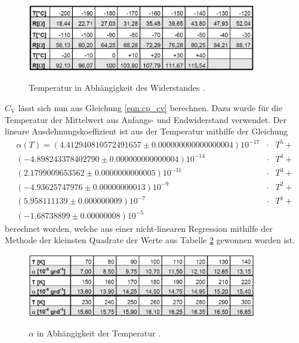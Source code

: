 \begin{figure}[!h]
	\centering
	\caption[]{Temperatur in Abhängigkeit des Widerstandes \cite{V47}.}
	\includegraphics[width = 10cm]{img/temperatur.png}	
	\label{Temperatur}
\end{figure}

$C_\mathrm{V}$ lässt sich nun aus Gleichung \eqref{eqn:cp_cv} 
berechnen.
Dazu wurde für die Temperatur der Mittelwert aus Anfangs- und Endwiderstand verwendet.
Der lineare Ausdehnungskoeffizient ist aus der Temperatur mithilfe der Gleichung
\begin{eqnarray*}
	\alpha(T) = 
	(4.412940810572491657\pm0.000000000000000004)10^{-17} &\cdot& T^5 +\\
	(-4.898243378402790\pm0.000000000000004)10^{-14} &\cdot& T^4 + \\
	(2.1799009653562\pm0.0000000000005)10^{-11} &\cdot& T^3 + \\
	(-4.93625747976\pm0.00000000013)10^{-9} &\cdot& T^2 + \\
	(5.958111139\pm0.000000009)10^{-7} &\cdot& T^1 + \\
	(-1.68738899\pm0.00000008)10^{-5} &&
\end{eqnarray*}
berechnet worden, welche aus einer nicht-linearen Regression mithilfe der Methode der kleinsten Quadrate der Werte aus Tabelle \ref{Alpha} gewonnen worden ist.

\begin{figure}[!h]
	\centering
	\caption[]{$\alpha$ in Abhängigkeit der Temperatur \cite{V47}.}
	\includegraphics[width = 10cm]{img/alpha.png}	
	\label{Alpha}
\end{figure}